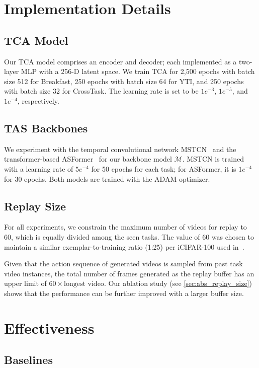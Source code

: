 \section{Implementation Details}

\subsection{TCA Model}

Our TCA model comprises an encoder and decoder; each implemented as a two-layer MLP with a 256-D latent space. We train TCA for 2,500 epochs with batch size 512 for Breakfast, 250 epochs with batch size 64 for YTI, and 250 epochs with batch size 32 for CrossTask. The learning rate is set to be $1e^{-3}$, $1e^{-5}$, and $1e^{-4}$, respectively.

\subsection{TAS Backbones}

We experiment with the temporal convolutional network MSTCN~\cite{farha2019ms} and the transformer-based ASFormer~\cite{yi2021asformer}
for our backbone model $\mathcal{M}$. MSTCN is trained with a learning rate of $5e^{-4}$ for 50 epochs for each task; for ASFormer, it is $1e^{-4}$ for 30 epochs. Both models are trained with the ADAM optimizer. 

\subsection{Replay Size}

For all experiments, we constrain the maximum number of videos for replay to 60, which is equally divided among the seen tasks. The value of 60 was chosen to maintain a similar exemplar-to-training ratio (1:25) per iCIFAR-100 used in~\cite{rebuffi2017icarl}.

Given that the action sequence of generated videos is sampled from past task video instances, the total number of frames generated as the replay buffer has an upper limit of $60\times\text{longest video}$. Our ablation study (see \cref{sec:abs_replay_size}) shows that the performance can be further improved with a larger buffer size. 

\section{Effectiveness}

\subsection{Baselines}

